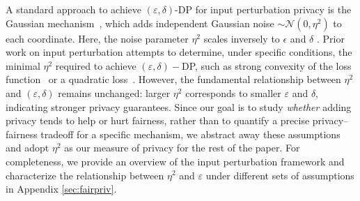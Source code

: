 \documentclass[11pt,letterpaper]{article}
\newtheorem{lemma}{Lemma}
\begin{document}
A standard approach to achieve $(\varepsilon, \delta)$-DP for input perturbation privacy is the Gaussian mechanism~\citep{dwork2014algorithmic}, which adds independent Gaussian noise $\sim \mathcal{N}(0, \eta^2)$ to each coordinate. Here, the noise parameter $\eta^2$ scales inversely to $\epsilon$ and $\delta$ \citep{dwork2014algorithmic}. Prior work on input perturbation attempts to determine, under specific conditions, the minimal $\eta^2$ required to achieve $(\varepsilon, \delta)-$DP, such as strong convexity of the loss function~\citep{kang2020inputperturbationnewparadigm} or a quadratic loss~\citep{fukuchi2017differentially}. However, the fundamental relationship between $\eta^2$ and $(\varepsilon, \delta)$ remains unchanged: larger $\eta^2$ corresponds to smaller $\varepsilon$ and $\delta$, indicating stronger privacy guarantees. Since our goal is to study \textit{whether} adding privacy tends to help or hurt fairness, rather than to quantify a precise privacy–fairness tradeoff for a specific mechanism, we abstract away these assumptions and adopt $\eta^2$ as our measure of privacy for the rest of the paper. For completeness, we provide an overview of the input perturbation framework and characterize the relationship between $\eta^2$ and $\varepsilon$ under different sets of assumptions in Appendix \ref{sec:fairpriv}.







\end{document}
